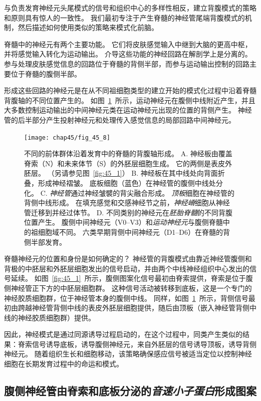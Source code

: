与负责发育神经元头尾模式的信号和组织中心的多样性相反，建立背腹模式的策略和原则具有惊人的一致性。
我们最初专注于产生脊髓的神经管尾端背腹模式的机制，然后描述如何使用类似的策略来模式化前脑。


脊髓中的神经元有两个主要功能。
它们将皮肤感觉输入中继到大脑的更高中枢，并将感觉输入转化为运动输出。
介导这些功能的神经回路在解剖学上是分离的。
参与处理皮肤感觉信息的回路位于脊髓的背侧半部，而参与运动输出控制的回路主要位于脊髓的腹侧半部。


形成这些回路的神经元是在从不同祖细胞类型的建立开始的模式化过程中沿着脊髓背腹轴的不同位置产生的。
如图~\ref{fig:45_8}~所示，运动神经元在腹侧中线附近产生，并且大多数控制运动输出的中间神经元类在运动神经元出现的位置的背侧产生。
神经管的后半部分产生投射神经元和处理传入感觉信息的局部回路中间神经元。


\begin{figure}[htbp]
	\centering
	\texttt{[image: chap45/fig\_45\_8]}
	\caption{不同的前体群体沿着发育中的脊髓的背腹轴形成。
		A. 神经板由覆盖脊索（N）和未来体节（S）的外胚层细胞生成。
		它的两侧是表皮外胚层。
		（另请参见图~\ref{fig:45_1}）
		B. 神经板在其中线处向背面折叠，形成神经褶皱。
		底板细胞（蓝色）在神经管的腹侧中线处分化。
		C. \textit{神经管}通过神经皱襞的背尖融合形成。
		\textit{顶板}细胞在神经管的背侧中线形成。
		在填充感觉和交感神经节之前，\textit{神经嵴}细胞从神经管迁移到并经过体节。
		D. 不同类别的神经元在\textit{胚胎脊髓}的不同背腹位置产生。
		腹侧中间神经元（V0–V3）和\textit{运动神经元}与腹侧脊髓中的祖细胞域不同。
		六类早期背侧中间神经元（D1–D6）在脊髓的背侧半部发育\cite{goulding2002formation}。}
	\label{fig:45_8}
\end{figure}


脊髓神经元的位置和身份是如何确定的？
神经管的背腹模式由靠近神经管腹侧和背极的中胚层和外胚层细胞发出的信号启动，并由两个中线神经组织中心发出的信号延续。
如图~\ref{fig:45_1}~所示，腹侧图案化信号最初由脊索提供，脊索是位于腹侧神经管正下方的中胚层细胞群。
这种信号活动被转移到底板，这是一个专门的神经胶质细胞群，位于神经管本身的腹侧中线。
同样，如图~\ref{fig:45_8}~所示，背侧信号最初由跨越神经管背侧中线的表皮外胚层细胞提供，随后由顶板（嵌入神经管背侧中线的神经胶质细胞群）提供。


因此，神经模式是通过同源诱导过程启动的，在这个过程中，同类产生类似的结果：脊索信号诱导底板，诱导腹侧神经元，来自外胚层的信号诱导顶板，诱导背侧神经元。
随着组织生长和细胞移动，该策略确保感应信号被适当定位以控制神经细胞在长期发育过程中的命运和模式。



\subsection{腹侧神经管由脊索和底板分泌的\textit{音速小子蛋白}形成图案}

